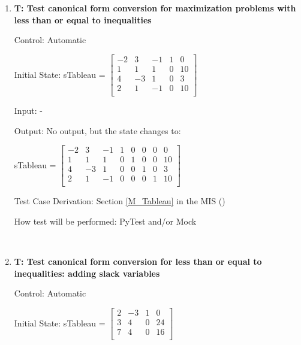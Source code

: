 \documentclass[12pt, titlepage]{article}
\newcounter{testnum} %
\begin{document}
\begin{enumerate}
		
	\item{\textbf{T\thetestnum \label{canonicalMax}: 
	Test canonical form conversion for maximization problems with less than or 
	equal to inequalities}}
		
	Control: Automatic 
		
	Initial State: sTableau = $\begin{bmatrix}
	-2 & 3 & -1 & 1 & 0\\
	1 & 1 & 1 & 0 & 10\\
	4 & -3 & 1 & 0 & 3\\
	2 & 1 & -1 & 0 & 10\\
	\end{bmatrix}$
		
	Input: -
		
	Output: No output, but the state changes to:
	
	sTableau = $\begin{bmatrix}
	-2 & 3 & -1 & 1 & 0 & 0 & 0 & 0\\
	1 & 1 & 1 & 0 & 1 & 0 & 0 & 10\\
	4 & -3 & 1 & 0 & 0 & 1 & 0 & 3\\
	2 & 1 & -1 & 0 & 0 & 0 & 1 & 10\\
	\end{bmatrix}$
	
	Test Case Derivation: Section \ref{M_Tableau} in the MIS (\cite{losms-mis})
		
	How test will be performed: PyTest and/or Mock
	
	 \\


	\item{\textbf{T\thetestnum \label{canonicalSlack}: 
	Test canonical form conversion for less than or equal to inequalities: 
	adding slack variables}}
	
	Control: Automatic 
	
	Initial State: sTableau = $\begin{bmatrix}
	2 & -3 & 1 & 0\\
	3 & 4 & 0 & 24\\
	7 & 4 & 0 & 16\\
	\end{bmatrix}$
	

\end{enumerate}
\end{document}
